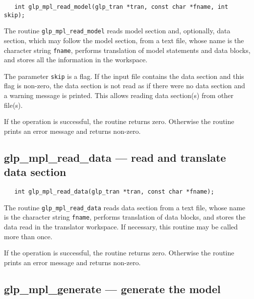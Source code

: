 \synopsis

\begin{verbatim}
   int glp_mpl_read_model(glp_tran *tran, const char *fname, int skip);
\end{verbatim}

\description

The routine \verb|glp_mpl_read_model| reads model section and,
optionally, data section, which may follow the model section, from a
text file, whose name is the character string \verb|fname|, performs
translation of model statements and data blocks, and stores all the
information in the workspace.

The parameter \verb|skip| is a flag. If the input file contains the
data section and this flag is non-zero, the data section is not read as
if there were no data section and a warning message is printed. This
allows reading data section(s) from other file(s).

\returns

If the operation is successful, the routine returns zero. Otherwise
the routine prints an error message and returns non-zero.

\subsection{glp\_mpl\_read\_data --- read and translate data section}

\synopsis

\begin{verbatim}
   int glp_mpl_read_data(glp_tran *tran, const char *fname);
\end{verbatim}

\description

The routine \verb|glp_mpl_read_data| reads data section from a text
file, whose name is the character string \verb|fname|, performs
translation of data blocks, and stores the data read in the translator
workspace. If necessary, this routine may be called more than once.

\returns

If the operation is successful, the routine returns zero. Otherwise
the routine prints an error message and returns non-zero.

\newpage

\subsection{glp\_mpl\_generate --- generate the model}

